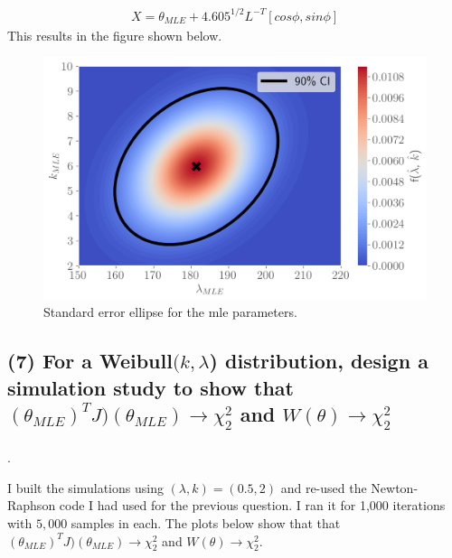 \documentclass[11pt]{article}
\begin{document}
\begin{align*}
    X = \theta_{MLE} + 4.605^{1/2} L^{-T} [cos \phi, sin\phi]
\end{align*}
This results in the figure shown below.



\begin{figure}[!h]
    \centering
    \includegraphics[scale=.55]{homework_2/figures/weibull_se.png}
    \caption{Standard error ellipse for the mle parameters.}
    \label{fig:my_label}
\end{figure}

\subsection*{(7) For a Weibull$(k,\lambda$) distribution, design a
simulation study to show that \\ $(\theta_{MLE})^TJ)(\theta_{MLE})\xrightarrow[]{} \chi^2_2$ and $W(\theta) \xrightarrow[]{}  \chi^2_2$}.

I built the simulations using $(\lambda, k) = (0.5, 2)$ and re-used the Newton-Raphson code I had used for the previous question. I ran it for 1,000 iterations with $5,000$ samples in each. The plots below show that that  $(\theta_{MLE})^TJ)(\theta_{MLE})\xrightarrow[]{} \chi^2_2$ and $W(\theta) \xrightarrow[]{}  \chi^2_2$.
\end{document}
